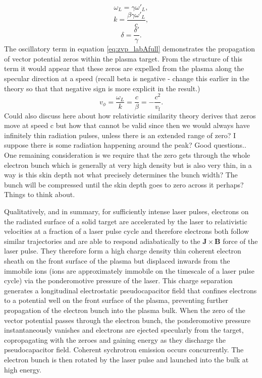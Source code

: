 \begin{equation}
	\omega_L = \gamma \omega'_L,
\end{equation}
\begin{equation}
	k = \frac{\beta \gamma\omega'_L}{c},
\end{equation}
\begin{equation}
	\delta = \frac{\delta'}{\gamma}.
\end{equation}
The oscillatory term in equation \ref{eq:zvp_labAfull} demonstrates the propagation of vector potential zeros within the plasma target. From the structure of this term it would appear that these zeros are expelled from the plasma along the specular direction at a speed (recall beta is negative - change this earlier in the theory so that that negative sign is more explicit in the result.)
\begin{equation}
	v_\phi = \frac{\omega_L}{k} = \frac{c}{\beta} = -\frac{c^2}{v_\mathrm{f}}.
\end{equation}
Could also discuss here about how relativistic similarity theory derives that zeros move at speed c but how that cannot be valid since then we would always have infinitely thin radiation pulses, unless there is an extended range of zero? I suppose there is some radiation happening around the peak? Good questions..
One remaining consideration is we require that the zero gets through the whole electron bunch which is generally at very high density but is also very thin, in a way is this skin depth not what precisely determines the bunch width? The bunch will be compressed until the skin depth goes to zero across it perhaps? Things to think about.


Qualitatively, and in summary, for sufficiently intense laser pulses, electrons on the radiated surface of a solid target are accelerated by the laser to relativistic velocities at a fraction of a laser pulse cycle and therefore electrons both follow similar trajectories and are able to respond adiabatically to the $\mathbf{J}\times \mathbf{B}$ force of the laser pulse. They therefore form a high charge density thin coherent electron sheath on the front surface of the plasma but displaced inwards from the immobile ions (ions are approximately immobile on the timescale of a laser pulse cycle) via the ponderomotive pressure of the laser. This charge separation generates a longitudinal electrostatic pseudocapacitor field that confines electrons to a potential well on the front surface of the plasma, preventing further propagation of the electron bunch into the plasma bulk. When the zero of the vector potential passes through the electron bunch, the ponderomotive pressure instantaneously vanishes and electrons are ejected specularly from the target, copropagating with the zeroes and gaining energy as they discharge the pseudocapacitor field. Coherent sychrotron emission occurs concurrently. The electron bunch is then rotated by the laser pulse and launched into the bulk at high energy.


